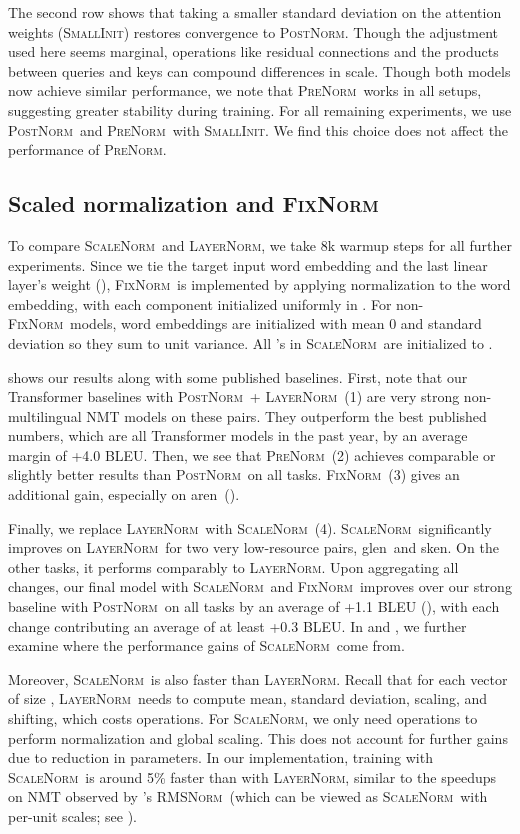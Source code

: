 \documentclass[11pt,a4paper]{article}
\newcommand{\arTOen}{ar\textrightarrow en}
\newcommand{\glTOen}{gl\textrightarrow en}
\newcommand{\skTOen}{sk\textrightarrow en}
\newcommand{\LNorm}{\textsc{LayerNorm}}
\newcommand{\SCNorm}{\textsc{ScaleNorm}}
\newcommand{\RMSNorm}{\textsc{RMSNorm}}
\newcommand{\PreNorm}{\textsc{PreNorm}}
\newcommand{\PostNorm}{\textsc{PostNorm}}
\newcommand{\fixnorm}{\textsc{FixNorm}}
\newcommand{\SmallInit}{\textsc{SmallInit}}
\begin{document}
The second row shows that taking a smaller standard deviation on the attention weights (\SmallInit) restores convergence to \PostNorm. Though the  adjustment used here seems marginal, operations like residual connections and the products between queries and keys can compound differences in scale. Though both models now achieve similar performance, we note that \PreNorm\ works in all setups, suggesting greater stability during training. For all remaining experiments, we use \PostNorm\ and \PreNorm\ with \SmallInit. We find this choice does not affect the performance of \PreNorm.


\subsection{Scaled  normalization and \fixnorm}
\label{sec:experiments_scnorm}

To compare \SCNorm\ and \LNorm, we take 8k warmup steps for all further experiments. Since we tie the target input word embedding and the last linear layer's weight (), \fixnorm\ is implemented by applying  normalization to the word embedding, with each component initialized uniformly in . For non-\fixnorm\ models, word embeddings are initialized with mean 0 and standard deviation  so they sum to unit variance. All 's in \SCNorm\ are initialized to .

 shows our results along with some published baselines. First, note that our Transformer baselines with \PostNorm\ + \LNorm\ (1) are very strong non-multilingual NMT models on these pairs. They outperform the best published numbers, which are all Transformer models in the past year, by an average margin of +4.0 BLEU. Then, we see that \PreNorm\ (2) achieves comparable or slightly better results than \PostNorm\ on all tasks. \fixnorm\ (3) gives an additional gain, especially on \arTOen\ ().

Finally, we replace \LNorm\ with \SCNorm\ (4). \SCNorm\ significantly improves on \LNorm\ for two very low-resource pairs, \glTOen\ and \skTOen. On the other tasks, it performs comparably to \LNorm. Upon aggregating all changes, our final model with \SCNorm\ and \fixnorm\ improves over our strong baseline with \PostNorm\ on all tasks by an average of +1.1 BLEU (), with each change contributing an average of at least +0.3 BLEU. In  and , we further examine where the performance gains of \SCNorm\ come from.

Moreover, \SCNorm\ is also faster than \LNorm. Recall that for each vector of size , \LNorm\ needs to compute mean, standard deviation, scaling, and shifting, which costs  operations. For \SCNorm, we only need  operations to perform normalization and global scaling. This does not account for further gains due to reduction in parameters. In our implementation, training with \SCNorm\ is around 5\% faster than with \LNorm, similar to the speedups on NMT observed by \citet{Zhang2019}'s \RMSNorm\ (which can be viewed as \SCNorm\ with per-unit scales; see ).
\end{document}
